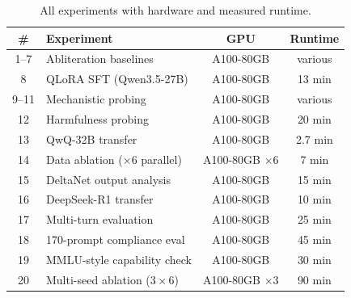 \documentclass{article}
\begin{document}
\begin{table}[H]
\centering
\small
\caption{All experiments with hardware and measured runtime.}
\label{tab:runtime}
\begin{tabular}{clcc}
\toprule
\textbf{\#} & \textbf{Experiment} & \textbf{GPU} & \textbf{Runtime} \\
\midrule
1--7 & Abliteration baselines & A100-80GB & various \\
8 & QLoRA SFT (Qwen3.5-27B) & A100-80GB & 13 min \\
9--11 & Mechanistic probing & A100-80GB & various \\
12 & Harmfulness probing & A100-80GB & 20 min \\
13 & QwQ-32B transfer & A100-80GB & 2.7 min \\
14 & Data ablation ($\times$6 parallel) & A100-80GB $\times$6 & 7 min \\
15 & DeltaNet output analysis & A100-80GB & 15 min \\
16 & DeepSeek-R1 transfer & A100-80GB & 10 min \\
17 & Multi-turn evaluation & A100-80GB & 25 min \\
18 & 170-prompt compliance eval & A100-80GB & 45 min \\
19 & MMLU-style capability check & A100-80GB & 30 min \\
20 & Multi-seed ablation ($3 \times 6$) & A100-80GB $\times$3 & 90 min \\
\bottomrule
\end{tabular}
\end{table}
\end{document}
